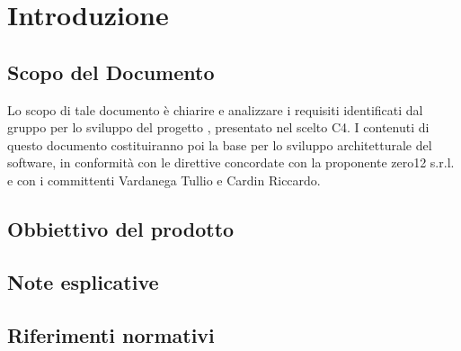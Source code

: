\chapter{Introduzione}

\section{Scopo del Documento}
Lo scopo di tale documento è chiarire e analizzare i requisiti identificati dal gruppo  per lo sviluppo del progetto , presentato nel  scelto C4.
I contenuti di questo documento costituiranno poi la base per lo sviluppo architetturale del software, in conformità con le direttive concordate con la proponente zero12 s.r.l. e con i committenti Vardanega Tullio e Cardin Riccardo.
\section{Obbiettivo del prodotto}


\section{Note esplicative}

\section{Riferimenti normativi}